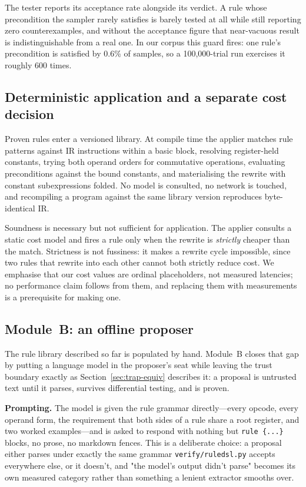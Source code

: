 \documentclass[conference]{IEEEtran}
\begin{document}
The tester reports its acceptance rate alongside its verdict. A rule whose
precondition the sampler rarely satisfies is barely tested at all while still
reporting zero counterexamples, and without the acceptance figure that
near-vacuous result is indistinguishable from a real one. In our corpus this
guard fires: one rule's precondition is satisfied by 0.6\% of samples, so a
100{,}000-trial run exercises it roughly 600 times.

\subsection{Deterministic application and a separate cost decision}
\label{sec:cost-model}

Proven rules enter a versioned library. At compile time the applier matches
rule patterns against IR instructions within a basic block, resolving
register-held constants, trying both operand orders for commutative operations,
evaluating preconditions against the bound constants, and materialising the
rewrite with constant subexpressions folded. No model is consulted, no network
is touched, and recompiling a program against the same library version
reproduces byte-identical IR.

Soundness is necessary but not sufficient for application. The applier consults
a static cost model and fires a rule only when the rewrite is \emph{strictly}
cheaper than the match. Strictness is not fussiness: it makes a rewrite cycle
impossible, since two rules that rewrite into each other cannot both strictly
reduce cost. We emphasise that our cost values are ordinal placeholders, not
measured latencies; no performance claim follows from them, and replacing them
with measurements is a prerequisite for making one.

\subsection{Module~B: an offline proposer}
\label{sec:module-b}

The rule library described so far is populated by hand. Module~B closes that
gap by putting a language model in the proposer's seat while leaving the trust
boundary exactly as Section~\ref{sec:trap-equiv} describes it: a proposal is
untrusted text until it parses, survives differential testing, and is proven.

\textbf{Prompting.} The model is given the rule grammar directly---every
opcode, every operand form, the requirement that both sides of a rule share a
root register, and two worked examples---and is asked to respond with nothing
but \texttt{rule \{...\}} blocks, no prose, no markdown fences. This is a
deliberate choice: a proposal either parses under exactly the same grammar
\texttt{verify/ruledsl.py} accepts everywhere else, or it doesn't, and "the
model's output didn't parse" becomes its own measured category rather than
something a lenient extractor smooths over.
\end{document}
